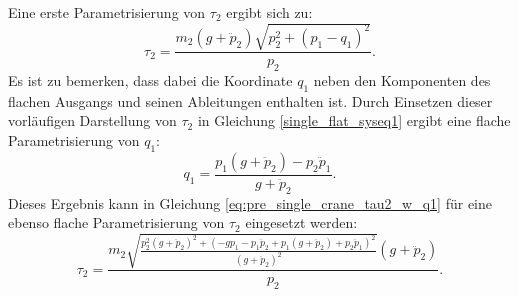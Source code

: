 Eine erste Parametrisierung von $\tau_2$ ergibt sich zu:
\begin{equation}
	\label{eq:pre_single_crane_tau2_w_q1}
	\tau_2 = \frac{m_{2} \left(g + \ddot{p}_{2}\right) \sqrt{p_{2}^{2} + \left(p_{1} - q_{1}\right)^{2}}}{p_{2}}.
\end{equation}
Es ist zu bemerken, dass dabei die Koordinate $q_1$ neben den Komponenten des flachen Ausgangs und seinen Ableitungen enthalten ist. Durch Einsetzen dieser vorläufigen Darstellung von $\tau_2$ in Gleichung \eqref{single_flat_syseq1} ergibt eine flache Parametrisierung von $q_1$:
\begin{equation}
	q_1 = \frac{p_{1} \left(g + \ddot{p}_{2}\right) - p_{2} \ddot{p}_{1}}{g + \ddot{p}_{2}}.
\end{equation}
Dieses Ergebnis kann in Gleichung \eqref{eq:pre_single_crane_tau2_w_q1} für eine ebenso flache Parametrisierung von $\tau_2$ eingesetzt werden:
\begin{equation}
	\tau_2 =
	\frac{m_{2} \sqrt{\frac{p_{2}^{2} \left(g + \ddot{p}_{2}\right)^{2} + \left(- g p_{1} - p_{1} \ddot{p}_{2} + p_{1} \left(g + \ddot{p}_{2}\right) + p_{2} \ddot{p}_{1}\right)^{2}}{\left(g + \ddot{p}_{2}\right)^{2}}} \left(g + \ddot{p}_{2}\right)}{p_{2}}.
\end{equation}

